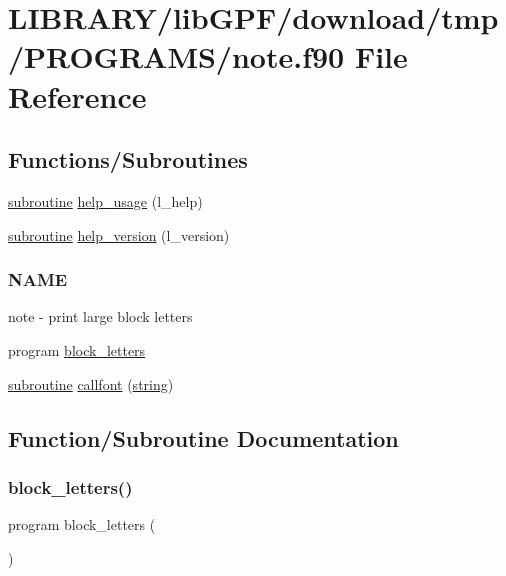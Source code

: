 \hypertarget{note_8f90}{}\section{L\+I\+B\+R\+A\+R\+Y/lib\+G\+P\+F/download/tmp/\+P\+R\+O\+G\+R\+A\+M\+S/note.f90 File Reference}
\label{note_8f90}
\subsection*{Functions/\+Subroutines}
\begin{DoxyCompactItemize}
\item 
\hyperlink{M__stopwatch_83_8txt_acfbcff50169d691ff02d4a123ed70482}{subroutine} \hyperlink{note_8f90_a3e09a3b52ee8fb04eeb93fe5761626a8}{help\+\_\+usage} (l\+\_\+help)
\item 
\hyperlink{M__stopwatch_83_8txt_acfbcff50169d691ff02d4a123ed70482}{subroutine} \hyperlink{note_8f90_a39c21619b08a3c22f19e2306efd7f766}{help\+\_\+version} (l\+\_\+version)
\begin{DoxyCompactList}\small\item\em \subsubsection*{N\+A\+ME}

note -\/ print large block letters \end{DoxyCompactList}\item 
program \hyperlink{note_8f90_a783e8e0dd3deddd7a125ab0a6f20341c}{block\+\_\+letters}
\item 
\hyperlink{M__stopwatch_83_8txt_acfbcff50169d691ff02d4a123ed70482}{subroutine} \hyperlink{note_8f90_a05dfb57174f958e4973af20d00512f49}{callfont} (\hyperlink{what__overview_81_8txt_a74cb7e955273b9f9157b4f0c18a38849}{string})
\end{DoxyCompactItemize}


\subsection{Function/\+Subroutine Documentation}
\mbox{\label{note_8f90_a783e8e0dd3deddd7a125ab0a6f20341c}} 
\subsubsection{\texorpdfstring{block\+\_\+letters()}{block\_letters()}}
{\footnotesize\ttfamily program block\+\_\+letters (\begin{DoxyParamCaption}{ }\end{DoxyParamCaption})}



